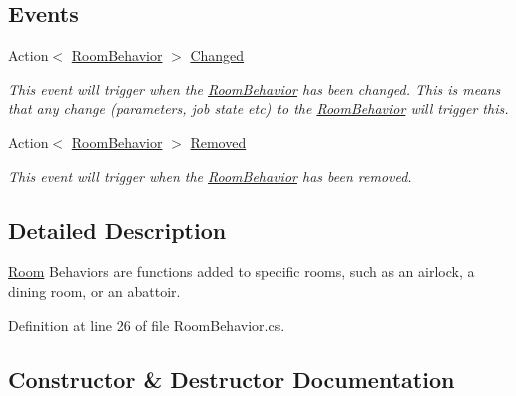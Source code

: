 \subsection*{Events}
\begin{DoxyCompactItemize}
\item 
Action$<$ \hyperlink{class_project_porcupine_1_1_rooms_1_1_room_behavior}{Room\+Behavior} $>$ \hyperlink{class_project_porcupine_1_1_rooms_1_1_room_behavior_af53085bc4c6cc1c1ff3785dc318bccbc}{Changed}
\begin{DoxyCompactList}\small\item\em This event will trigger when the \hyperlink{class_project_porcupine_1_1_rooms_1_1_room_behavior}{Room\+Behavior} has been changed. This is means that any change (parameters, job state etc) to the \hyperlink{class_project_porcupine_1_1_rooms_1_1_room_behavior}{Room\+Behavior} will trigger this. \end{DoxyCompactList}\item 
Action$<$ \hyperlink{class_project_porcupine_1_1_rooms_1_1_room_behavior}{Room\+Behavior} $>$ \hyperlink{class_project_porcupine_1_1_rooms_1_1_room_behavior_ab49ba34c2107945554b224fe814cf212}{Removed}
\begin{DoxyCompactList}\small\item\em This event will trigger when the \hyperlink{class_project_porcupine_1_1_rooms_1_1_room_behavior}{Room\+Behavior} has been removed. \end{DoxyCompactList}\end{DoxyCompactItemize}


\subsection{Detailed Description}
\hyperlink{class_project_porcupine_1_1_rooms_1_1_room}{Room} Behaviors are functions added to specific rooms, such as an airlock, a dining room, or an abattoir. 



Definition at line 26 of file Room\+Behavior.\+cs.



\subsection{Constructor \& Destructor Documentation}
\mbox{\label{class_project_porcupine_1_1_rooms_1_1_room_behavior_af35b1412339f8b04d90890e65e4eb29b}} 
